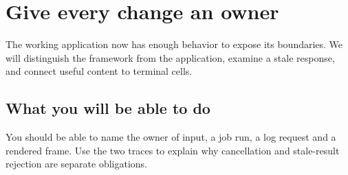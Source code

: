 \chapter*{Give every change an owner}

The working application now has enough behavior to expose its boundaries. We will distinguish the framework from the application, examine a stale response, and connect useful content to terminal cells.

\section*{What you will be able to do}

You should be able to name the owner of input, a job run, a log request and a rendered frame. Use the two traces to explain why cancellation and stale-result rejection are separate obligations.
